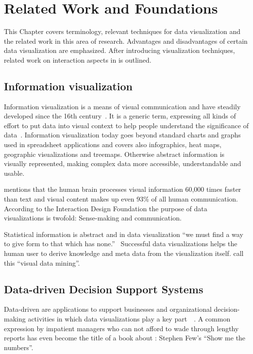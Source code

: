\chapter{Related Work and Foundations}\label{sec:related-work}

This Chapter covers terminology, relevant techniques for data visualization and the related work in this area of research.
Advantages and disadvantages of certain data visualization are emphasized.
After introducing visualization techniques, related work on interaction aspects in \cmvs{} is outlined.


\section{Information visualization}
Information visualization is a means of visual communication and have steadily developed since the 16th century~\parencite{Friendly2001}.
It is a generic term, expressing all kinds of effort to put data into visual context to help people understand the significance of data~\parencite{Rose2017}.
Information visualization today goes beyond standard charts and graphs used in spreadsheet applications and covers also infographics, heat maps, geographic visualizations and treemaps.
Otherwise abstract information is visually represented, making complex data more accessible, understandable and usable.

\textcite{Kusinitz2014} mentions that the human brain processes visual information 60,000 times faster than text and visual content makes up even 93\% of all human communication.
According to the Interaction Design Foundation the purpose of data visualizations is twofold:
Sense-making and communication.

Statistical information is abstract and in data visualization ``we must find a way to give form to that which has none.''~\parencite{Few2013}
Successful data visualizations helps the human user to derive knowledge and meta data from the visualization itself.
\textcite{Nocke2002} call this ``visual data mining''.

\section{Data-driven Decision Support Systems}
Data-driven \dss{} are applications to support businesses and organizational decision-making activities in which data visualizations play a key part~\parencite{Nada2007}~\parencite{Poleto2015}.
A common expression by impatient managers who can not afford to wade through lengthy reports has even become the title of a book about \dss{}:
Stephen Few's ``Show me the numbers''.

